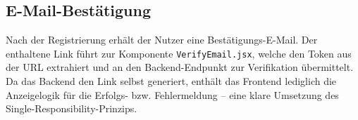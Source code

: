 \subsection{E-Mail-Bestätigung}

Nach der Registrierung erhält der Nutzer eine Bestätigungs-E-Mail. Der enthaltene Link führt zur Komponente \texttt{VerifyEmail.jsx}, welche den Token aus der URL extrahiert und an den Backend-Endpunkt zur Verifikation übermittelt. Da das Backend den Link selbst generiert, enthält das Frontend lediglich die Anzeigelogik für die Erfolgs- bzw. Fehlermeldung -- eine klare Umsetzung des Single-Responsibility-Prinzips.

